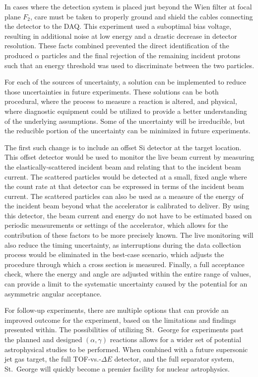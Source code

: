 In cases where the detection system is placed just beyond the Wien
filter at focal plane $F_2$, care must be taken to properly ground and
shield the cables connecting the detector to the DAQ. This experiment
used a suboptimal bias voltage, resulting in additional noise at low
energy and a drastic decrease in detector resolution. These facts
combined prevented the direct identification of the produced $\alpha$
particles and the final rejection of the remaining incident protons such
that an energy threshold was used to discriminate between the two
particles.

For each of the sources of uncertainty, a solution can be implemented to
reduce those uncertainties in future experiments. These solutions can be
both procedural, where the process to measure a reaction is altered, and
physical, where diagnostic equipment could be utilized to provide a
better understanding of the underlying assumptions. Some of the
uncertainty will be irreducible, but the reducible portion of the
uncertainty can be minimized in future experiments.

The first such change is to include an offset Si detector at the target
location. This offset detector would be used to monitor the live beam
current by measuring the elastically-scattered incident beam and
relating that to the incident beam current. The scattered particles
would be detected at a small, fixed angle where the count rate at that
detector can be expressed in terms of the incident beam current. The
scattered particles can also be used as a measure of the energy of the
incident beam beyond what the accelerator is calibrated to deliver. By
using this detector, the beam current and energy do not have to be
estimated based on periodic measurements or settings of the accelerator,
which allows for the contribution of these factors to be more precisely
known. The live monitoring will also reduce the timing uncertainty, as
interruptions during the data collection process would be eliminated in
the best-case scenario, which adjusts the procedure through which a
cross section is measured. Finally, a full acceptance check, where the
energy and angle are adjusted within the entire range of values, can
provide a limit to the systematic uncertainty caused by the potential
for an asymmetric angular acceptance.

For follow-up experiments, there are multiple options that can provide
an improved outcome for the experiment, based on the limitations and
findings presented within. The possibilities of utilizing St.\ George
for experiments past the planned and designed $(\alpha,\gamma)$
reactions allows for a wider set of potential astrophysical studies to
be performed. When combined with a future supersonic jet gas target, the
full TOF-vs.-$\Delta E$ detector, and the full separator system, St.\
George will quickly become a premier facility for nuclear astrophysics.



